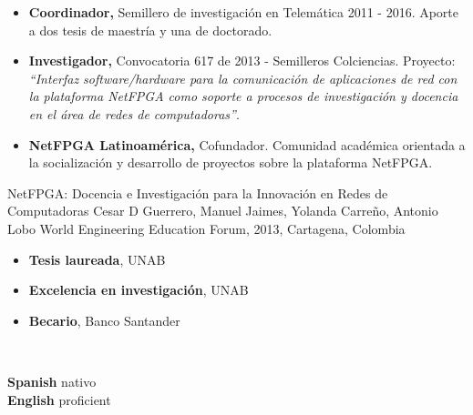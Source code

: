 \documentclass[9pt]{developercv}
\begin{document}
	\begin{minipage}{\textwidth}
		
		\begin{itemize}[noitemsep,nolistsep,leftmargin=*]
			\item \textbf{Coordinador,} Semillero de investigación en Telemática 2011 - 2016. Aporte a dos tesis de maestría y una de doctorado.
			\item \textbf{Investigador,} Convocatoria 617 de 2013 - Semilleros Colciencias. Proyecto: \textit{“Interfaz software/hardware para la comunicación de aplicaciones de red con la plataforma NetFPGA como soporte a procesos de investigación y docencia en el área de redes de computadoras”}.
			\item \textbf{NetFPGA Latinoamérica,} Cofundador. Comunidad académica orientada a la socialización y desarrollo de proyectos sobre la plataforma NetFPGA.
		\end{itemize}
	\end{minipage}

	\begin{minipage}{\textwidth}
	
	NetFPGA: Docencia e Investigación para la Innovación en Redes de Computadoras Cesar D Guerrero, Manuel Jaimes, Yolanda Carreño, Antonio Lobo World Engineering Education Forum, 2013, Cartagena, Colombia
	\end{minipage}
	
	\begin{minipage}{0.4\textwidth}
		
		\begin{itemize}[noitemsep,nolistsep,leftmargin=*]
			\item \textbf{Tesis laureada}, UNAB
			\item \textbf{Excelencia en investigación}, UNAB
			\item \textbf{Becario}, Banco Santander
		\end{itemize}
	\end{minipage}
	\begin{minipage}{0.3\textwidth}
		
		\\
	\end{minipage}
	\begin{minipage}{0.3\textwidth}
		
		\textbf{Spanish} nativo\\
		\textbf{English} proficient
	\end{minipage}
	
\end{document}
